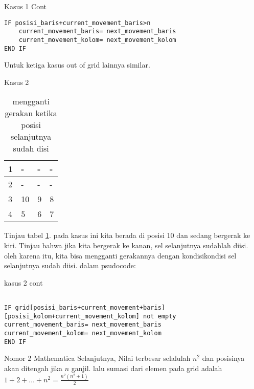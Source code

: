 \documentclass{beamer}
\begin{document}
\begin{frame}[fragile]{Kasus 1 Cont}
     \begin{verbatim}
IF posisi_baris+current_movement_baris>n
    current_movement_baris= next_movement_baris
    current_movement_kolom= next_movement_kolom
END IF
    \end{verbatim}
    Untuk ketiga kasus out of grid lainnya similar.
\end{frame}

\begin{frame}{Kasus 2}
    \begin{table}[!h]
        \centering
        \caption{mengganti gerakan ketika posisi selanjutnya sudah disi}
        \begin{tabular}{|l|l|l|l|}
        \hline
            1 & - & - & - \\ \hline
            2 & - & - & - \\ \hline
            3 & 10 & 9 & 8 \\ \hline
            4 & 5 & 6 & 7 \\ \hline
        \end{tabular}
        \label{spiralgrid2}
    \end{table}


    Tinjau tabel \ref{spiralgrid2}. pada kasus ini kita berada di posisi 10 dan sedang bergerak ke kiri.
    Tinjau bahwa jika kita bergerak ke kanan, sel selanjutnya sudahlah diisi. oleh karena itu,
    kita bisa mengganti gerakannya dengan kondisikondisi sel selanjutnya sudah diisi.
    dalam psudocode:
    
\end{frame}

\begin{frame}[fragile]{kasus 2 cont}
\small
\begin{verbatim}

IF grid[posisi_baris+current_movement+baris]
[posisi_kolom+current_movement_kolom] not empty
current_movement_baris= next_movement_baris
current_movement_kolom= next_movement_kolom
END IF
\end{verbatim}
\end{frame}

\begin{frame}{Nomor 2 Mathematica}
Selanjutnya, Nilai terbesar selalulah $n^2$ dan posisinya akan ditengah jika $n$ ganjil.
lalu sumasi dari elemen pada grid adalah $1+2+\dots +n^2= \frac{n^2 (n^2+1)}{2}$
\end{frame}
\end{document}
